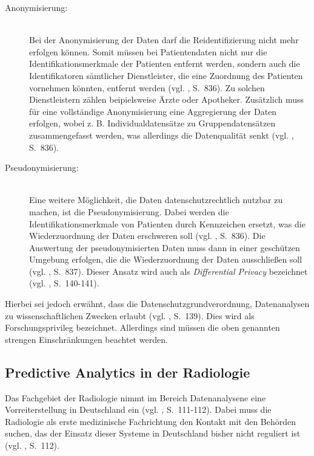 \begin{description}

\item[Anonymisierung:] \hfill \\
Bei der Anonymisierung der Daten darf die Reidentifizierung nicht mehr erfolgen können.
Somit müssen bei Patientendaten nicht nur die Identifikationsmerkmale der Patienten entfernt werden, sondern
auch die Identifikatoren sämtlicher Dienstleister, die eine Zuordnung des Patienten vornehmen könnten,
entfernt werden (vgl. \cite{Weichert}, S.~836). Zu solchen Dienstleistern zählen beipielsweise Ärzte oder Apotheker.
Zusätzlich muss für eine vollständige Anonymisierung eine Aggregierung der Daten erfolgen, wobei z. B. Individualdatensätze
zu Gruppendatensätzen zusammengefasst werden, was allerdings die Datenqualität senkt (vgl. \cite{Weichert}, S.~836).

\item[Pseudonymisierung:] \hfill \\
Eine weitere Möglichkeit, die Daten datenschutzrechtlich nutzbar zu machen, ist die Pseudonymisierung.
Dabei werden die Identifikationsmerkmale von Patienten durch Kennzeichen ersetzt, was die Wiederzuordnung der Daten
erschweren soll (vgl. \cite{Weichert}, S.~836). Die Auswertung der pseudonymisierten Daten muss dann in einer geschützen
Umgebung erfolgen, die die Wiederzuordnung der Daten ausschließen soll (vgl. \cite{Weichert}, S.~837).
Dieser Ansatz wird auch als \emph{Differential Privacy} bezeichnet (vgl. \cite{Jorzig}, S.~140-141).

\end{description}

Hierbei sei jedoch erwähnt, dass die Datenschutzgrundverordnung, Datenanalysen zu wissenschaftlichen Zwecken erlaubt
(vgl. \cite{Jorzig}, S.~139). Dies wird als Forschungsprivileg bezeichnet. Allerdings sind müssen die oben genannten
strengen Einschränkungen beachtet werden.

\subsection{Predictive Analytics in der Radiologie}

Das Fachgebiet der Radiologie nimmt im Bereich Datenanalysene eine Vorreiterstellung in Deutschland ein (vgl. \cite{Jorzig}, S.~111-112).
Dabei muss die Radiologie als erste medizinische Fachrichtung den Kontakt mit den Behörden suchen, das der Einsatz
dieser Systeme in Deutschland bisher nicht reguliert ist (vgl. \cite{Jorzig}, S.~112).

